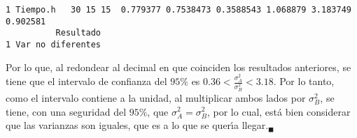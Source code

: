 \begin{solucion}
\begin{verbatim}
1 Tiempo.h   30 15 15  0.779377 0.7538473 0.3588543 1.068879 3.183749  0.902581
          Resultado
1 Var no diferentes
 \end{verbatim}
 \vspace{-0.5cm}
 Por lo que, al redondear al decimal en que coinciden los resultados anteriores, se tiene que el intervalo de confianza del $95\%$ es $0.36 < \frac{\sigma_A^2}{\sigma_B^2} < 3.18$. Por lo tanto, como el intervalo contiene a la unidad, al multiplicar ambos lados por $\sigma_B^2$, se tiene, con una seguridad del $95\%$, que $\sigma_A^2 = \sigma_B^2$, por lo cual, est\'a bien considerar que las varianzas son iguales, que es a lo que se quer\'{\i}a llegar.${}_{\blacksquare}$
\end{solucion}
